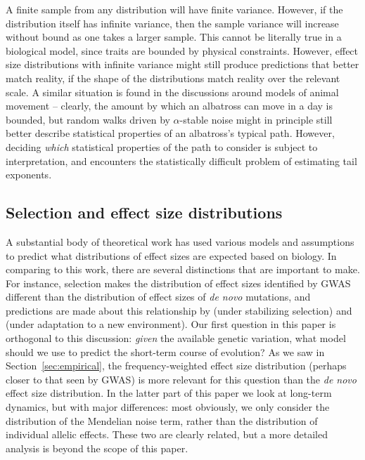 \documentclass{article}
\newcommand{\1}{\mathbbm{1}}
\theoremstyle{remark}
\theoremstyle{definition}
\begin{document}
A finite sample from any distribution will have finite variance.
However, if the distribution itself has infinite variance,
then the sample variance will increase without bound as one takes a larger sample.
This cannot be literally true in a biological model, since traits are bounded
by physical constraints.
However, effect size distributions with infinite variance
might still produce predictions that better match reality,
if the shape of the distributions match reality over the relevant scale.
A similar situation is found in the discussions around models of animal movement \citep{benhamou2007animals}
-- clearly, the amount by which an albatross can move in a day is bounded,
but random walks driven by $\alpha$-stable noise
might in principle still better describe statistical properties of an albatross's typical path.
However, deciding \emph{which} statistical properties of the path to consider
is subject to interpretation,
and encounters the statistically difficult problem of estimating tail exponents.

\subsection*{Selection and effect size distributions} 

A substantial body of theoretical work has used various models and assumptions
to predict what distributions of effect sizes are expected based on biology.
In comparing to this work, there are several distinctions that are important to make.
For instance, selection makes the distribution of effect sizes identified by GWAS
different than the distribution of effect sizes of \emph{de novo} mutations,
and predictions are made about this relationship by \citet{simons2018population} %
(under stabilizing selection)
and \citet{hayward2022polygenic}
(under adaptation to a new environment).
Our first question in this paper is orthogonal to this discussion:
\emph{given} the available genetic variation,
what model should we use to predict the short-term course of evolution?
As we saw in Section~\ref{sec:empirical},
the frequency-weighted effect size distribution (perhaps closer to that seen by GWAS)
is more relevant for this question than the \emph{de novo} effect size distribution.
In the latter part of this paper we look at long-term dynamics,
but with major differences:
most obviously, we only consider the distribution of the Mendelian noise term,
rather than the distribution of individual allelic effects.
These two are clearly related, but a more detailed analysis is beyond the scope of this paper.
\end{document}
